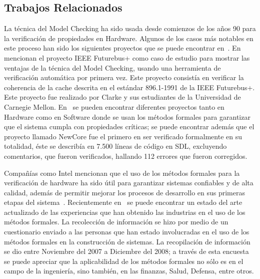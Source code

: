 \subsection{Trabajos Relacionados}

La t\'ecnica del Model Checking ha sido usada desde comienzos de los años 90 para la verificaci\'on de propiedades en Hardware. Algunos de los casos m\'as notables en este proceso han sido los siguientes proyectos que se puede encontrar en~\cite{Clarke1996, Woodcock2009}.  En~\cite{Clarke1996} mencionan el proyecto IEEE Futurebus+ como caso de estudio para mostrar las ventajas de la t\'ecnica del Model Checking, usando una herramienta de verificaci\'on autom\'atica por primera vez. Este proyecto consist\'ia en verificar la coherencia de la cache descrita en el est\'andar 896.1-1991 de la IEEE Futurebus+. Este proyecto fue realizado por Clarke y sus estudiantes de la Universidad de Carnegie Mellon. En~\cite{Clarke1996} se pueden encontrar diferentes proyectos tanto en Hardware como en Software donde se usan los m\'etodos formales para garantizar que el sistema cumpla con propiedades cr\'iticas; se puede encontrar adem\'as que el proyecto llamado NewCore fue el primero en ser verificado formalmente en su totalidad, \'este se describ\'ia en 7.500 l\'ineas de c\'odigo en SDL, excluyendo comentarios, que fueron verificados, hallando 112 errores que fueron corregidos.

Compañ\'ias como Intel mencionan que el uso de los m\'etodos formales para la verificaci\'on de hardware ha sido \'util para garantizar sistemas confiables y de alta calidad, adem\'as de permitir mejorar los procesos de desarrollo en sus primeras etapas del sistema~\cite{Fix2008}. 
Recientemente en~\cite{Woodcock2009} se puede encontrar un estado del arte actualizado de las experiencias que han obtenido las industrias en el uso de los m\'etodos formales. La recolecci\'on de informaci\'on se hizo por medio de un cuestionario enviado a las personas que han estado involucradas en el uso de los m\'etodos formales en la construcci\'on de sistemas. La recopilaci\'on de informaci\'on se dio entre Noviembre del 2007 a Diciembre del 2008; a trav\'es de esta encuesta se puede apreciar que la aplicabilidad de los m\'etodos formales no s\'olo es en el campo de la ingenier\'ia, sino tambi\'en, en las finanzas, Salud, Defensa, entre otros.  

